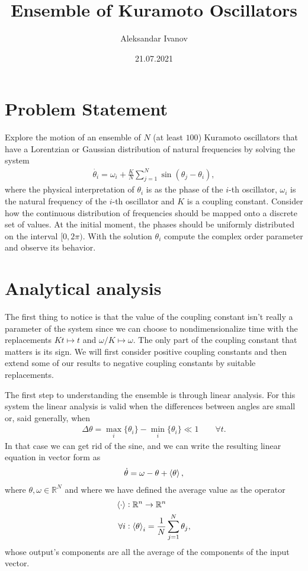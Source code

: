 \documentclass[10pt,a4paper,twocolumn]{article}
\begin{document}
\title{Ensemble of Kuramoto Oscillators}
\author{Aleksandar Ivanov}
\date{21.07.2021}
\maketitle

\section{Problem Statement}

Explore the motion of an ensemble of $N$ (at least $100$) Kuramoto oscillators that have a Lorentzian or Gaussian distribution of natural frequencies by solving the system
%
\begin{align}\label{eq:kuramoto}
    \dot{\theta_i} = \omega_i + \frac{K}{N} \sum_{j=1}^N \sin(\theta_j - \theta_i),
\end{align}
%
where the physical interpretation of $\theta_i$ is as the phase of the $i$-th oscillator, $\omega_i$ is the natural frequency of the $i$-th oscillator and $K$ is a coupling constant. Consider how the continuous distribution of frequencies should be mapped onto a discrete set of values. At the initial moment, the phases should be uniformly distributed on the interval $[0, 2 \pi)$. With the solution $\theta_i$ compute the complex order parameter and observe its behavior.

\section{Analytical analysis}

The first thing to notice is that the value of the coupling constant isn't really a parameter of the system since we can choose to nondimensionalize time with the replacements $Kt \mapsto t$ and $\omega/K \mapsto \omega$. The only part of the coupling constant that matters is its sign. We will first consider positive coupling constants and then extend some of our results to negative coupling constants by suitable replacements.

The first step to understanding the ensemble is through linear analysis. For this system the linear analysis is valid when the differences between angles are small or, said generally, when
%
\begin{align}
    \Delta \theta = \max_i\{\theta_i\} - \min_i\{\theta_i\} \ll 1 \quad \quad \forall t.
\end{align}
In that case we can get rid of the sine, and we can write the resulting linear equation in vector form as
%
\begin{align}
    \dot{\theta} = \omega - \theta + \braket{\theta},
\end{align}
%
where $\theta, \omega \in \mathbb{R}^N$ and where we have defined the average value as the operator
%
\begin{align}
    \braket{\cdot}&: \mathbb{R}^n \rightarrow \mathbb{R}^n \notag\\
    \forall i&: \braket{\theta}_i = \frac{1}{N} \sum_{j=1}^N \theta_j,
\end{align}
%
whose output's components are all the average of the components of the input vector.
\end{document}

